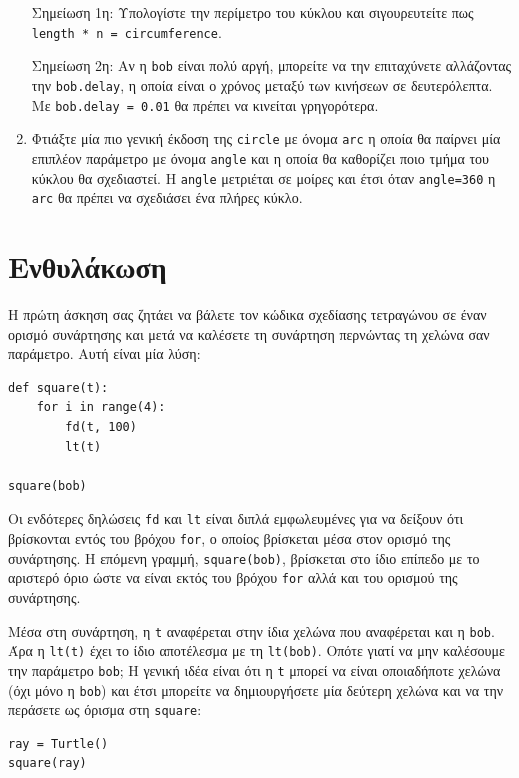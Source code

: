 \documentclass[10pt]{book}
\begin{document}
\begin{enumerate}
Σημείωση 1η: Υπολογίστε την περίμετρο του κύκλου και σιγουρευτείτε πως {\tt length * n = circumference}.

Σημείωση 2η: Αν η {\tt bob} είναι πολύ αργή, μπορείτε να την επιταχύνετε αλλάζοντας την {\tt bob.delay}, η οποία είναι ο χρόνος μεταξύ των κινήσεων σε δευτερόλεπτα. Με {\tt bob.delay = 0.01} θα πρέπει να κινείται γρηγορότερα.


\item Φτιάξτε μία πιο γενική έκδοση της {\tt circle} με όνομα {\tt arc} 
η οποία θα παίρνει μία επιπλέον παράμετρο με όνομα {\tt angle} και η οποία θα καθορίζει ποιο τμήμα του  κύκλου θα σχεδιαστεί. Η {\tt angle} μετριέται σε μοίρες και έτσι όταν {\tt angle=360} η {\tt arc} θα πρέπει να σχεδιάσει ένα πλήρες κύκλο.

\end{enumerate}

\section{Ενθυλάκωση}

Η πρώτη άσκηση σας ζητάει να βάλετε τον κώδικα σχεδίασης τετραγώνου σε
έναν ορισμό συνάρτησης και μετά να καλέσετε τη συνάρτηση περνώντας τη χελώνα σαν παράμετρο. Αυτή είναι μία λύση:


\begin{verbatim}
def square(t):
    for i in range(4):
        fd(t, 100)
        lt(t)

square(bob)
\end{verbatim}
%

Οι ενδότερες δηλώσεις {\tt fd} και {\tt lt} είναι διπλά εμφωλευμένες για να
δείξουν ότι βρίσκονται εντός του βρόχου {\tt for}, ο οποίος βρίσκεται μέσα στον
ορισμό της συνάρτησης. Η επόμενη γραμμή, {\tt square(bob)}, βρίσκεται στο
ίδιο επίπεδο με το αριστερό όριο ώστε να είναι εκτός του βρόχου {\tt for} αλλά και του ορισμού της συνάρτησης.

Μέσα στη συνάρτηση, η {\tt t} αναφέρεται στην ίδια χελώνα που αναφέρεται και η
{\tt bob}. Άρα η {\tt lt(t)} έχει το ίδιο αποτέλεσμα με τη {\tt lt(bob)}. 
Οπότε γιατί να μην καλέσουμε την παράμετρο {\tt bob}; Η γενική ιδέα είναι ότι η {\tt t} μπορεί να είναι οποιαδήποτε χελώνα (όχι μόνο η {\tt bob}) και έτσι μπορείτε να δημιουργήσετε μία δεύτερη χελώνα και να την περάσετε ως όρισμα στη {\tt square}:


\begin{verbatim}
ray = Turtle()
square(ray)
\end{verbatim}
%
\end{document}
